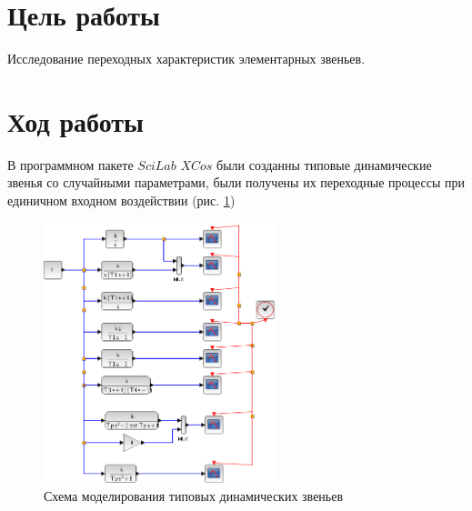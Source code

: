 \documentclass[a4paper,12pt,russian]{article} %
\begin{document}
		

	\renewcommand\titleBotRIGHT{
	\spboxmm{100}{70}{70}{30}{lc}{\parbox{70mm}{
			\normalsize{Преподаватель: Чепинский С.А. }\\ 
			\normalsize{Студенты: Французов Р.А.\\  Донцова М.А.}\\
			\normalsize{Группа: R3325}\\
			\normalsize{Вариант: 18}}}}

		\maketitle
		
		\section{Цель работы}
		Исследование переходных характеристик элементарных звеньев. \\
		
		\section{Ход работы}
В программном пакете $SciLab$ $XCos$ были созданны типовые динамические звенья со случайными параметрами, были получены их переходные процессы при единичном входном воздействии (рис. \ref{sim})  \\
\begin{figure}[H]
	\centering\includegraphics[width=0.6\textwidth]{sim}
	\caption{Схема моделирования типовых динамических звеньев}\label{sim}
\end{figure}
\end{document}
